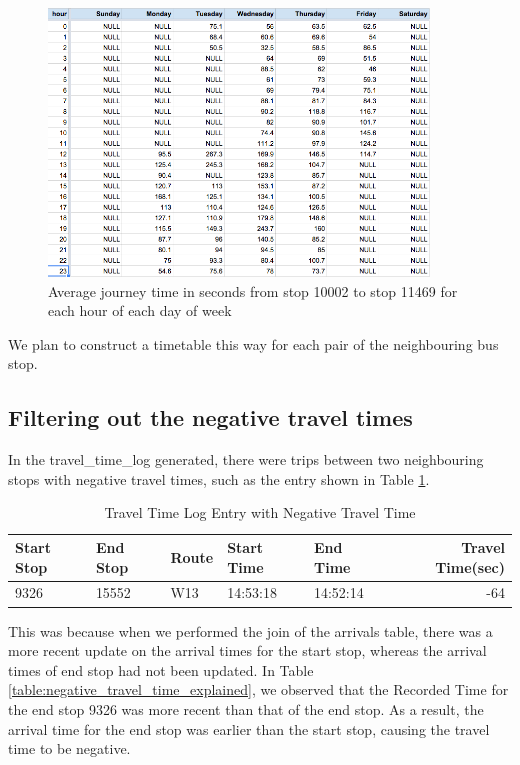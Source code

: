 \begin{figure}
\centering
\includegraphics[width=0.9\textwidth]{figures/timetable_10002.png}
\caption{\label{fig:timetable_10002} Average journey time in seconds from stop 10002 to stop 11469 for each hour of each day of week}
\end{figure}

\par We plan to construct a timetable this way for each pair of the neighbouring bus stop.

\subsection{Filtering out the negative travel times}
\par In the travel\_time\_log generated, there were trips between two neighbouring stops with negative travel times, such as the entry shown in Table \ref{table:travel_time_log_negative}.

\begin{table}
\centering
\begin{tabular}{@{}lllllr@{}} \toprule
Start Stop & End Stop & Route & Start Time & End Time & Travel Time(sec) \\ \midrule
9326 & 15552 & W13 & 14:53:18 & 14:52:14 & -64 \\ \bottomrule
\end{tabular}
\caption{Travel Time Log Entry with Negative Travel Time}
\label{table:travel_time_log_negative}
\end{table}

\par This was because when we performed the join of the arrivals table, there was a more recent update on the arrival times for the start stop, whereas the arrival times of end stop had not been updated. In Table \ref{table:negative_travel_time_explained}, we observed that the Recorded Time for the end stop 9326 was more recent than that of the end stop. As a result, the arrival time for the end stop was earlier than the start stop, causing the travel time to be negative.

